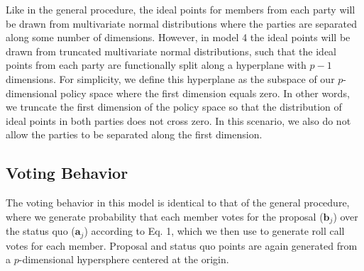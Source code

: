 \documentclass[12pt]{article}
\begin{document}
Like in the general procedure, the ideal points for members from each party will be drawn from multivariate normal distributions where the parties are separated along some number of dimensions. However, in model 4 the ideal points will be drawn from truncated multivariate normal distributions, such that the ideal points from each party are functionally split along a hyperplane with $p-1$ dimensions. For simplicity, we define this hyperplane as the subspace of our $p$-dimensional policy space where the first dimension equals zero. In other words, we truncate the first dimension of the policy space so that the distribution of ideal points in both parties does not cross zero. In this scenario, we also do not allow the parties to be separated along the first dimension.

\subsection*{Voting Behavior}

The voting behavior in this model is identical to that of the general procedure, where we generate probability that each member votes for the proposal ($\boldsymbol{b}_j$) over the status quo ($\boldsymbol{a}_j$) according to Eq. 1, which we then use to generate roll call votes for each member. Proposal and status quo points are again generated from a $p$-dimensional hypersphere centered at the origin.
\end{document}
